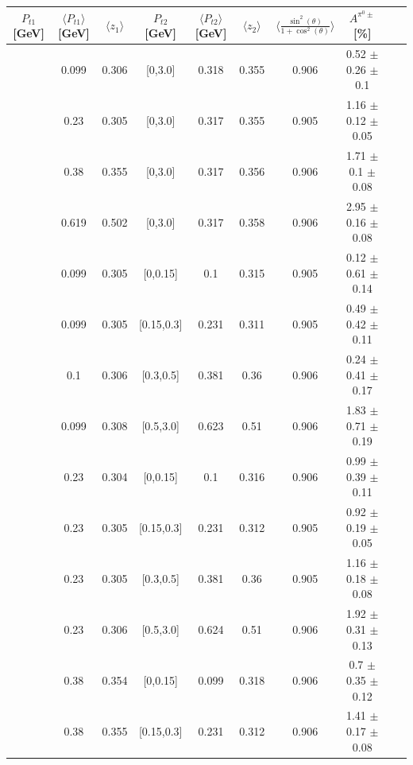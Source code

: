 \begin{table}[H]\tiny
\centering
\begin{tabular}{|c| c| c| c| c| c| c| c| c| c|}
\hline
$P_{t1}$   [GeV] & $\langle  P_{t1}  \rangle$ [GeV] & $\langle  z_1 \rangle$& $P_{t2}$  [GeV] & $\langle  P_{t2}\rangle$  [GeV] &  $\langle  z_2 \rangle$  &$\langle\frac{\sin^2(\theta)}{1+\cos^2(\theta)}\rangle$&  $A^{\pi^0\pm}$ [\%]  \\ \hline
[0,0.15]	&	0.099	&	0.306	&	[0,3.0]	&	0.318	&	0.355	&	0.906	&     0.52  $\pm$ 0.26  $\pm$ 0.1 	\\ \hline
[0.15,0.3]	&	0.23	        &	0.305	&	[0,3.0]	&	0.317	&	0.355	&	0.905  &1.16  $\pm$ 0.12  $\pm$ 0.05 	\\ \hline
[0.3,0.5]	&	0.38	        &	0.355	&	[0,3.0]	&	0.317	&	0.356	&	0.906 & 1.71  $\pm$ 0.1  $\pm$ 0.08   	\\ \hline
[0.5,3.0]	&	0.619	&	0.502	&	[0,3.0]	&	0.317	&	0.358	&	0.906	&     2.95  $\pm$ 0.16  $\pm$ 0.08 	\\ \hline
\hline
[0,0.15]	&	0.099	&	0.305	&	[0,0.15]	&	0.1	        &	0.315	&	0.905	&0.12  $\pm$ 0.61  $\pm$ 0.14  	\\ \hline
[0,0.15]	&	0.099	&	0.305	&	[0.15,0.3]	&	0.231	&	0.311	&	0.905   	&0.49  $\pm$ 0.42  $\pm$ 0.11  	\\ \hline
[0,0.15]	&	0.1	        &	0.306	&	[0.3,0.5]	&	0.381	&	0.36	         &0.906       &0.24  $\pm$ 0.41  $\pm$ 0.17       	\\ \hline
[0,0.15]	&	0.099	&	0.308	&	[0.5,3.0]	&	0.623	&	0.51	        &	0.906	&1.83  $\pm$ 0.71  $\pm$ 0.19  		\\ \hline
\hline
[0.15,0.3]	&	0.23	        &	0.304	&	[0,0.15]	&	0.1	        &	0.316	&0.906        &0.99  $\pm$ 0.39  $\pm$ 0.11  	\\ \hline
[0.15,0.3]	&	0.23	        &	0.305	&	[0.15,0.3]	&	0.231	&	0.312	&	0.905	&0.92  $\pm$ 0.19  $\pm$ 0.05  		\\ \hline
[0.15,0.3]	&	0.23	        &	0.305	&	[0.3,0.5]	&	0.381	&	0.36	        &0.905	&1.16  $\pm$ 0.18  $\pm$ 0.08  	\\ \hline
[0.15,0.3]	&	0.23	        &	0.306	&	[0.5,3.0]	&	0.624	&	0.51	        & 0.906	& 1.92  $\pm$ 0.31  $\pm$ 0.13 	\\ \hline
\hline
[0.3,0.5]	&	0.38	        &	0.354	&	[0,0.15]	&	0.099	&	0.318	&	0.906	&0.7  $\pm$ 0.35  $\pm$ 0.12   		\\ \hline
[0.3,0.5]	&	0.38	        &	0.355	&	[0.15,0.3]	&	0.231	&	0.312	&	0.906	&1.41  $\pm$ 0.17  $\pm$ 0.08  	\\ \hline

\end{tabular}
\end{table}
